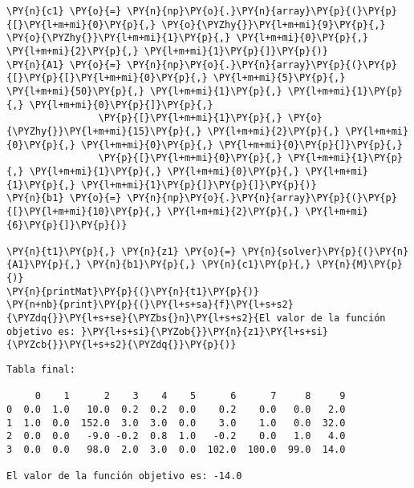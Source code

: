 \documentclass[12pt]{article}
\begin{document}
\begin{tcolorbox}[breakable, size=fbox, boxrule=1pt, pad at break*=1mm,colback=cellbackground, colframe=cellborder]
\begin{Verbatim}[commandchars=\\\{\}]
\PY{n}{c1} \PY{o}{=} \PY{n}{np}\PY{o}{.}\PY{n}{array}\PY{p}{(}\PY{p}{[}\PY{l+m+mi}{0}\PY{p}{,} \PY{o}{\PYZhy{}}\PY{l+m+mi}{9}\PY{p}{,} \PY{o}{\PYZhy{}}\PY{l+m+mi}{1}\PY{p}{,} \PY{l+m+mi}{0}\PY{p}{,} \PY{l+m+mi}{2}\PY{p}{,} \PY{l+m+mi}{1}\PY{p}{]}\PY{p}{)}
\PY{n}{A1} \PY{o}{=} \PY{n}{np}\PY{o}{.}\PY{n}{array}\PY{p}{(}\PY{p}{[}\PY{p}{[}\PY{l+m+mi}{0}\PY{p}{,} \PY{l+m+mi}{5}\PY{p}{,} \PY{l+m+mi}{50}\PY{p}{,} \PY{l+m+mi}{1}\PY{p}{,} \PY{l+m+mi}{1}\PY{p}{,} \PY{l+m+mi}{0}\PY{p}{]}\PY{p}{,}
                \PY{p}{[}\PY{l+m+mi}{1}\PY{p}{,} \PY{o}{\PYZhy{}}\PY{l+m+mi}{15}\PY{p}{,} \PY{l+m+mi}{2}\PY{p}{,} \PY{l+m+mi}{0}\PY{p}{,} \PY{l+m+mi}{0}\PY{p}{,} \PY{l+m+mi}{0}\PY{p}{]}\PY{p}{,}
                \PY{p}{[}\PY{l+m+mi}{0}\PY{p}{,} \PY{l+m+mi}{1}\PY{p}{,} \PY{l+m+mi}{1}\PY{p}{,} \PY{l+m+mi}{0}\PY{p}{,} \PY{l+m+mi}{1}\PY{p}{,} \PY{l+m+mi}{1}\PY{p}{]}\PY{p}{]}\PY{p}{)}
\PY{n}{b1} \PY{o}{=} \PY{n}{np}\PY{o}{.}\PY{n}{array}\PY{p}{(}\PY{p}{[}\PY{l+m+mi}{10}\PY{p}{,} \PY{l+m+mi}{2}\PY{p}{,} \PY{l+m+mi}{6}\PY{p}{]}\PY{p}{)}

\PY{n}{t1}\PY{p}{,} \PY{n}{z1} \PY{o}{=} \PY{n}{solver}\PY{p}{(}\PY{n}{A1}\PY{p}{,} \PY{n}{b1}\PY{p}{,} \PY{n}{c1}\PY{p}{,} \PY{n}{M}\PY{p}{)}
\PY{n}{printMat}\PY{p}{(}\PY{n}{t1}\PY{p}{)}
\PY{n+nb}{print}\PY{p}{(}\PY{l+s+sa}{f}\PY{l+s+s2}{\PYZdq{}}\PY{l+s+se}{\PYZbs{}n}\PY{l+s+s2}{El valor de la función objetivo es: }\PY{l+s+si}{\PYZob{}}\PY{n}{z1}\PY{l+s+si}{\PYZcb{}}\PY{l+s+s2}{\PYZdq{}}\PY{p}{)}
\end{Verbatim}
\end{tcolorbox}

\begin{Verbatim}[commandchars=\\\{\}]
Tabla final:

     0    1      2    3    4    5      6      7     8     9
0  0.0  1.0   10.0  0.2  0.2  0.0    0.2    0.0   0.0   2.0
1  1.0  0.0  152.0  3.0  3.0  0.0    3.0    1.0   0.0  32.0
2  0.0  0.0   -9.0 -0.2  0.8  1.0   -0.2    0.0   1.0   4.0
3  0.0  0.0   98.0  2.0  3.0  0.0  102.0  100.0  99.0  14.0

El valor de la función objetivo es: -14.0
\end{Verbatim}
\end{document}
